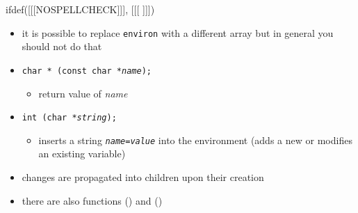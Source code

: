 ifdef([[[NOSPELLCHECK]]], [[[
]]])

\begin{slide}
\begin{itemize}
\item it is possible to replace \texttt{environ} with a different array but in
general you should not do that
\item \texttt{char * (const char *\emph{name});}
    \begin{itemize}
    \item return value of \emph{name}
    \end{itemize}
\item \texttt{int  (char *\emph{string});} 
    \begin{itemize}
    \item inserts a string \texttt{\emph{name}=\emph{value}} into the
    environment (adds a new or modifies an existing variable)
    \end{itemize}
\item changes are propagated into children upon their creation
\item there are also functions () and ()
\end{itemize}
\end{slide}

